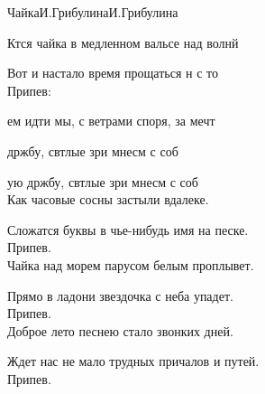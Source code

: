 \documentclass[11pt,a5paper]{book}
\renewcommand{\tt}{\indent \indent}
\begin{document}
\begin{song}{Чайка}{}{И.Грибулина}{И.Грибулина}{}{}

Ктся чайка в медленном вальсе над волнй\par
Вот и настало время прощаться н с то\\
 
Припев:\par
{}ем идти мы, с ветрами споря, за мечт\par
{} држбу, свтлые зри мнесм с соб \par
{}ую држбу, свтлые зри мнесм с соб\\
 
Как часовые сосны застыли вдалеке.\par
Сложатся буквы в чье-нибудь имя на песке.\\
 
Припев.\\
 
Чайка над морем парусом белым проплывет.\par
Прямо в ладони звездочка с неба упадет.\\
 
Припев.\\
 
Доброе лето песнею стало звонких дней.\par
Ждет нас не мало трудных причалов и путей.\\
 
Припев.\\
\end{song}
\end{document}
